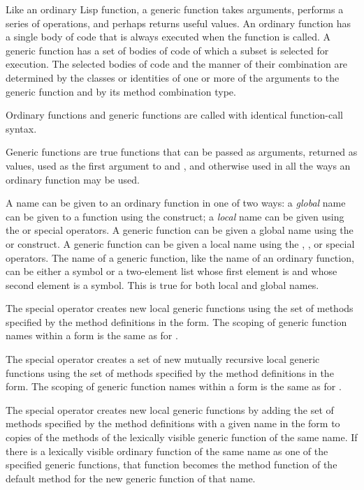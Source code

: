 Like an ordinary Lisp function, a generic function takes arguments,
performs a series of operations, and perhaps returns useful values.
An ordinary function has a single body of code that is always executed
when the function is called.  A generic function has a set of bodies
of code of which a subset is selected for execution. The selected
bodies of code and the manner of their combination are determined by
the classes or identities of one or more of the arguments to the
generic function and by its method combination type.

Ordinary functions and generic functions are called with identical function-call
syntax.
 
Generic functions are true functions that can be passed as arguments, returned as values,
used as the first argument to  and , and otherwise used in all the ways
an ordinary function may be used.

A name can be given to an ordinary function in one of
two ways: a \emph{global\/} name can be given to a function using the
 construct; a \emph{local\/} name can be given using the
 or  special operators.  A generic function can be
given a global name using the  or 
construct.  A generic function can be given a local name using the
, , or 
special operators.  The name of a generic function, like the name of an
ordinary function, can be either a symbol or a two-element list whose
first element is  and whose second element is a symbol.
This is true for both local and global names.

The  special operator creates new local generic
functions using the set of methods specified by the method definitions
in the  form.  The scoping of generic function names
within a  form is the same as for .

The  special operator creates a set of new mutually
recursive local generic functions using the set of methods specified
by the method definitions in the  form.  The
scoping of generic function names within a  form
is the same as for .

The  special operator creates new local generic
functions by adding the set of methods specified by the method
definitions with a given name in the  form to
copies of the methods of the lexically visible generic function of the
same name. If there is a lexically visible ordinary function of the
same name as one of the specified generic functions, that function
becomes the method function of the default method for the new generic
function of that name.

